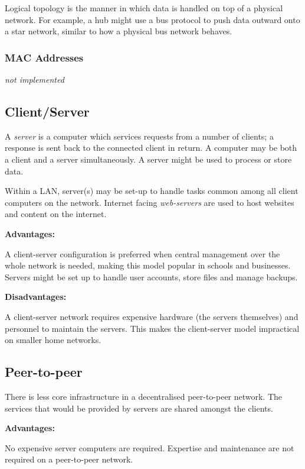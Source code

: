 \documentclass[10pt]{article}
\begin{document}
Logical topology is the manner in which data is handled on top of a physical network. For example, a hub might use a bus protocol to push data outward onto a star network, similar to how a physical bus network behaves.

\subsubsection{MAC Addresses}
\label{sec:orgce9904c}

\emph{not implemented}

\subsection{Client/Server}
\label{sec:orgd6038ed}

A \emph{server} is a computer which services requests from a number of clients; a response is sent back to the connected client in return. A computer may be both a client and a server simultaneously. A server might be used to process or store data.

Within a LAN, server(s) may be set-up to handle tasks common among all client computers on the network. Internet facing \emph{web-servers} are used to host websites and content on the internet.

\textbf{Advantages:}

A client-server configuration is preferred when central management over the whole network is needed, making this model popular in schools and businesses. Servers might be set up to handle user accounts, store files and manage backups.

\textbf{Disadvantages:}

A client-server network requires expensive hardware (the servers themselves) and personnel to maintain the servers. This makes the client-server model impractical on smaller home networks.

\subsection{Peer-to-peer}
\label{sec:org78073f3}

There is less core infrastructure in a decentralised peer-to-peer network. The services that would be provided by servers are shared amongst the clients.

\textbf{Advantages:}

No expensive server computers are required. Expertise and maintenance are not required on a peer-to-peer network.
\end{document}

